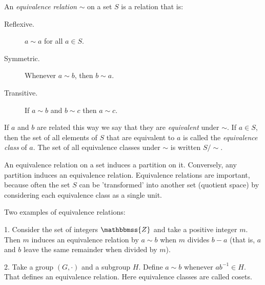 \documentclass[12pt]{article}
\newcommand{\Z}{\mathbbmss{Z}}
\begin{document}
An \emph{equivalence relation} $\sim$ on a set $S$ is a relation that is:
\begin{description}
\item[Reflexive.] $a\sim a$ for all $a\in S$.
\item[Symmetric.] Whenever $a\sim b$, then $b\sim a$.
\item[Transitive.] If $a\sim b$ and $b\sim c$ then $a\sim c$.
\end{description}
If $a$ and $b$ are related this way we say that they are \emph{equivalent} under $\sim$.
If $a\in S$, then the set of all elements of $S$ that are equivalent to $a$ is called the \emph{equivalence class} of $a$.  The set of all equivalence classes under $\sim$ is written $S/\sim$.

An equivalence relation on a set induces a partition on it.  Conversely, any partition induces an equivalence relation. Equivalence relations are important, because often the set $S$ can be 'transformed' into another set (quotient space) by considering each equivalence class as a single unit.

Two examples of equivalence relations:

1. Consider the set of integers $\Z$ and take a positive integer $m$. Then $m$ induces an equivalence relation by $a\sim b$ when $m$ divides $b-a$ (that is, $a$ and $b$ leave the same remainder when divided by $m$).

2. Take a group $(G,\cdot)$ and a subgroup $H$. Define $a\sim b$ whenever $ab^{-1}\in H$. That defines an equivalence relation. Here equivalence classes are called cosets.
\end{document}

